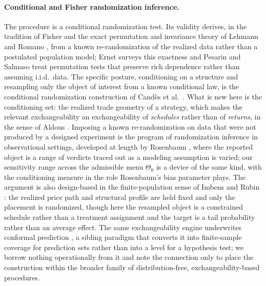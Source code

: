 \documentclass[preprint,12pt]{elsarticle}
\theoremstyle{definition}
\begin{document}
\paragraph{Conditional and Fisher randomization inference.} The procedure is a conditional
randomization test. Its validity derives, in the tradition of Fisher \cite{Fisher1935}
and the exact permutation and invariance theory of Lehmann and Romano \cite{LehmannRomano2005},
from a known re-randomization of the realized data rather than a postulated population
model; Ernst \cite{Ernst2004} surveys this exactness and Pesarin and Salmaso
\cite{PesarinSalmaso2010} treat permutation tests that preserve rich dependence rather
than assuming i.i.d.\ data. The specific posture, conditioning on a structure and resampling only
the object of interest from a known conditional law, is the conditional randomization
construction of Cand\`es et al.\ \cite{Candes2018}. What is new here is the conditioning
set: the realized trade geometry of a strategy, which makes the relevant exchangeability
an exchangeability of \emph{schedules} rather than of \emph{returns}, in the sense of
Aldous \cite{Aldous1985}. Imposing a known re-randomization on data that were not produced by a designed experiment is the program of randomization inference in observational settings, developed at length by Rosenbaum \cite{Rosenbaum2002}, where the reported object is a range of verdicts traced out as a modeling assumption is varied; our sensitivity range across the admissible menu $\Theta_0$ is a device of the same kind, with the conditioning measure in the role Rosenbaum's bias parameter plays. The argument is also design-based in the finite-population sense of Imbens and Rubin \cite{ImbensRubin2015}: the realized price path and structural profile are held fixed and only the placement is randomized, though here the resampled object is a constrained schedule rather than a treatment assignment and the target is a tail probability rather than an average effect. The same exchangeability engine underwrites conformal prediction \cite{Vovk2005,Lei2018}, a sibling paradigm that converts it into finite-sample coverage for prediction sets rather than into a level for a hypothesis test; we borrow nothing operationally from it and note the connection only to place the construction within the broader family of distribution-free, exchangeability-based procedures.
\end{document}

